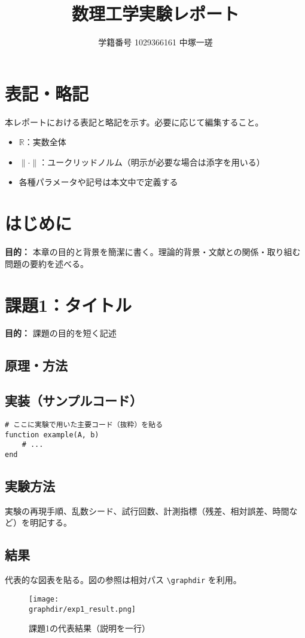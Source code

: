\documentclass[a4paper,11pt]{ltjsarticle}
\title{数理工学実験レポート\\[4pt]\large \ChapterTitle}
\author{学籍番号 1029366161 \quad 中塚一瑳}
\date{\ExperimentDate}
\newcommand{\graphdir}{graphs}
\newcommand{\R}{\mathbb{R}}
\newcommand{\ExperimentHeader}[2]{%
  \section{#1}%
  \textbf{目的：} #2\par\vspace{6pt}%
}
\begin{document}
\maketitle
\begin{abstract}
\end{abstract}

\tableofcontents
\clearpage

\section*{表記・略記}
本レポートにおける表記と略記を示す。必要に応じて編集すること。
\begin{itemize}
  \item $\R$：実数全体
  \item $\|\cdot\|$：ユークリッドノルム（明示が必要な場合は添字を用いる）
  \item 各種パラメータや記号は本文中で定義する
\end{itemize}

\ExperimentHeader{はじめに}{本章の目的と背景を簡潔に書く。理論的背景・文献との関係・取り組む問題の要約を述べる。}

\ExperimentHeader{課題1：タイトル}{課題の目的を短く記述}
\subsection{原理・方法}
\subsection{実装（サンプルコード）}
\begin{lstlisting}
# ここに実験で用いた主要コード（抜粋）を貼る
function example(A, b)
    # ...
end
\end{lstlisting}

\subsection{実験方法}
実験の再現手順、乱数シード、試行回数、計測指標（残差、相対誤差、時間など）を明記する。

\subsection{結果}
代表的な図表を貼る。図の参照は相対パス \verb|\graphdir| を利用。
\begin{figure}[H]
  \centering
  \texttt{[image: \\graphdir/exp1\_result.png]}
  \caption{課題1の代表結果（説明を一行）}
  \label{fig:exp1_result}
\end{figure}
\end{document}
